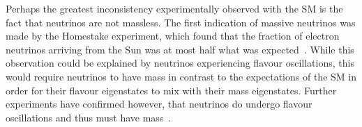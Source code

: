 Perhaps the greatest inconsistency experimentally observed with the SM is the fact that neutrinos are not massless.
The first indication of massive neutrinos was made by the Homestake experiment, which found that the fraction of electron neutrinos arriving from the Sun was at most half what was expected~\cite{PhysRevLett.20.1205}.
While this observation could be explained by neutrinos experiencing flavour oscillations, this would require neutrinos to have mass in contrast to the expectations of the SM in order for their flavour eigenstates to mix with their mass eigenstates.
Further experiments have confirmed however, that neutrinos do undergo flavour oscillations and thus must have mass~\cite{Fukuda:1998mi,Ahmad:2001an,PhysRevD.88.032002}.

%
